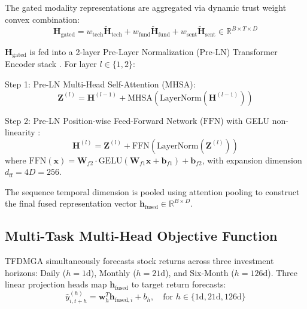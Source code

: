 The gated modality representations are aggregated via dynamic trust weight convex combination:
\begin{equation}
\mathbf{H}_{\text{gated}} = w_{\text{tech}} \tilde{\mathbf{H}}_{\text{tech}} + w_{\text{fund}} \tilde{\mathbf{H}}_{\text{fund}} + w_{\text{sent}} \tilde{\mathbf{H}}_{\text{sent}} \in \mathbb{R}^{B \times T \times D}
\label{eq:ch3_gated_sum}
\end{equation}

$\mathbf{H}_{\text{gated}}$ is fed into a 2-layer Pre-Layer Normalization ($\text{Pre-LN}$) Transformer Encoder stack \citep{vaswani2017attention, xiong2020layer}. For layer $l \in \{1, 2\}$:

Step 1: Pre-LN Multi-Head Self-Attention ($\text{MHSA}$):
\begin{equation}
\mathbf{Z}^{(l)} = \mathbf{H}^{(l-1)} + \text{MHSA}\left( \text{LayerNorm}(\mathbf{H}^{(l-1)}) \right)
\label{eq:ch3_pre_ln_mhsa}
\end{equation}

Step 2: Pre-LN Position-wise Feed-Forward Network ($\text{FFN}$) with GELU non-linearity \citep{hendrycks2016gaussian}:
\begin{equation}
\mathbf{H}^{(l)} = \mathbf{Z}^{(l)} + \text{FFN}\left( \text{LayerNorm}(\mathbf{Z}^{(l)}) \right)
\label{eq:ch3_pre_ln_ffn}
\end{equation}
where $\text{FFN}(\mathbf{x}) = \mathbf{W}_{f2} \cdot \text{GELU}(\mathbf{W}_{f1} \mathbf{x} + \mathbf{b}_{f1}) + \mathbf{b}_{f2}$, with expansion dimension $d_{\text{ff}} = 4D = 256$.

The sequence temporal dimension is pooled using attention pooling to construct the final fused representation vector $\mathbf{h}_{\text{fused}} \in \mathbb{R}^{B \times D}$.

\subsection{Multi-Task Multi-Head Objective Function}
\label{subsec:ch3_loss_function}

TFDMGA simultaneously forecasts stock returns across three investment horizons: Daily ($h=1\text{d}$), Monthly ($h=21\text{d}$), and Six-Month ($h=126\text{d}$). Three linear projection heads map $\mathbf{h}_{\text{fused}}$ to target return forecasts:
\begin{equation}
\hat{y}_{i,t+h}^{(h)} = \mathbf{w}_h^T \mathbf{h}_{\text{fused}, i} + b_h, \quad \text{for } h \in \{1\text{d}, 21\text{d}, 126\text{d}\}
\end{equation}


